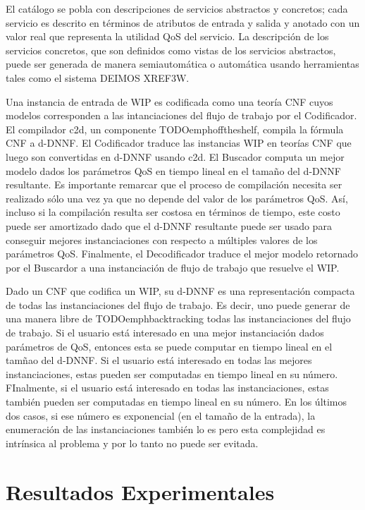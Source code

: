 \documentclass{article}
\begin{document}
El catálogo se pobla con descripciones de servicios abstractos y concretos; cada
servicio es descrito en términos de atributos de entrada y salida y anotado con
un valor real que representa la utilidad QoS del servicio. La descripción de los
servicios concretos, que son definidos como vistas de los servicios abstractos,
puede ser generada de manera semiautomática o automática usando herramientas
tales como el sistema DEIMOS XREF3W.

Una instancia de entrada de WIP es codificada como una teoría CNF cuyos modelos
corresponden a las intanciaciones del flujo de trabajo por el Codificador. El
compilador c2d, un componente TODOemphofftheshelf, compila la fórmula CNF a
d-DNNF. El Codificador traduce las instancias WIP en teorías CNF que luego son
convertidas en d-DNNF usando c2d. El Buscador computa un mejor modelo dados los
parámetros QoS en tiempo lineal en el tamaño del d-DNNF resultante. Es
importante remarcar que el proceso de compilación necesita ser realizado sólo
una vez ya que no depende del valor de los parámetros QoS. Así, incluso si la
compilación resulta ser costosa en términos de tiempo, este costo puede ser
amortizado dado que el d-DNNF resultante puede ser usado para conseguir mejores
instanciaciones con respecto a múltiples valores de los parámetros QoS.
Finalmente, el Decodificador traduce el mejor modelo retornado por el Buscardor
a una instanciación de flujo de trabajo que resuelve el WIP.

Dado un CNF que codifica un WIP, su d-DNNF es una representación compacta de
todas las instanciaciones del flujo de trabajo. Es decir, uno puede generar de
una manera libre de TODOemphbacktracking todas las instanciaciones del flujo de
trabajo. Si el usuario está interesado en una mejor instanciación dados
parámetros de QoS, entonces esta se puede computar en tiempo lineal en el tamñao
del d-DNNF. Si el usuario está interesado en todas las mejores instanciaciones,
estas pueden ser computadas en tiempo lineal en su número. FInalmente, si el
usuario está interesado en todas las instanciaciones, estas también pueden ser
computadas en tiempo lineal en su número. En los últimos dos casos, si ese
número es exponencial (en el tamaño de la entrada), la enumeración de las
instanciaciones también lo es pero esta complejidad es intrínsica al problema y
por lo tanto no puede ser evitada.

\section{Resultados Experimentales}
\end{document}
